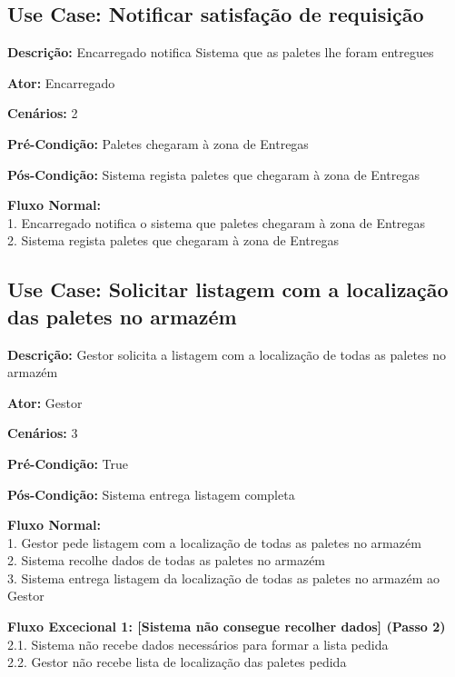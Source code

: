 \documentclass[11pt]{article}
\begin{document}
	    
\subsection{Use Case: Notificar satisfação de requisição}

\textbf{Descrição:} Encarregado notifica Sistema que as paletes lhe foram entregues

\textbf{Ator:} Encarregado

\textbf{Cenários:} 2

\textbf{Pré-Condição:} Paletes chegaram à zona de Entregas

\textbf{Pós-Condição:} Sistema regista paletes que chegaram à zona de Entregas

\textbf{Fluxo Normal:}\\
        1. Encarregado notifica o sistema que paletes chegaram à zona de Entregas\\
        2. Sistema regista paletes que chegaram à zona de Entregas
        
    
\vspace{3cm}

	    
\subsection{Use Case: Solicitar listagem com a localização das paletes no armazém}

\textbf{Descrição:} Gestor solicita a listagem com a localização de todas as paletes no armazém

\textbf{Ator:} Gestor

\textbf{Cenários:} 3

\textbf{Pré-Condição:} True

\textbf{Pós-Condição:} Sistema entrega listagem completa 

\textbf{Fluxo Normal:}\\
        1. Gestor pede listagem com a localização de todas as paletes no armazém\\
        2. Sistema recolhe dados de todas as paletes no armazém\\
        3. Sistema entrega listagem da localização de todas as paletes no armazém ao Gestor

\textbf{Fluxo Excecional 1: [Sistema não consegue recolher dados] (Passo 2)}\\
        2.1. Sistema não recebe dados necessários para formar a lista pedida\\
        2.2. Gestor não recebe lista de localização das paletes pedida
\end{document}
